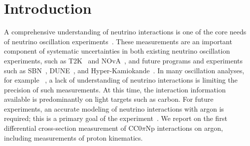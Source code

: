 \documentclass[%
twocolumn,
 amsmath,amssymb,
 aps,
prd,
superscriptaddress,showpacs]{revtex4-2}
\begin{document}
\maketitle


\section{Introduction}
\label{sec:intro}

A comprehensive understanding of neutrino interactions is one of the core needs of neutrino oscillation experiments~\cite{nustec-review}.  These measurements are %
an important component of systematic uncertainties in both existing neutrino oscillation experiments, such as T2K~\cite{Abe:2018wpn} and NOvA~\cite{Acero:2019ksn}, and future programs and experiments such as SBN~\cite{Antonello:2015lea}, DUNE~\cite{Abi:2020evt}, and Hyper-Kamiokande~\cite{HyperK_design_report}.
In many oscillation analyses, for example ~\cite{Abe:2018wpn,Acero:2019ksn}, a lack of understanding of neutrino interactions is limiting the precision of such measurements.  At this time, the interaction information available is predominantly on light targets such as carbon.
For future experiments, an accurate modeling of neutrino interactions with argon is required; this is a primary goal of the \mub  experiment~\cite{Acciarri:2016smiDET}. We report on the first differential cross-section measurement of CC0$\pi$Np interactions on argon, including measurements of proton kinematics.
\end{document}
